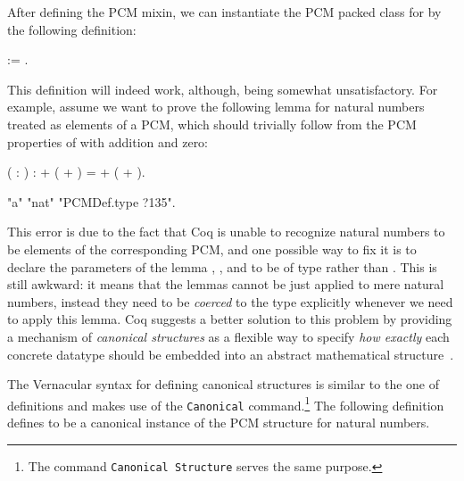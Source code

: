After defining the PCM mixin, we can instantiate the PCM packed class
for  by the following definition:


\begin{coqdoccode}
\coqdocemptyline
\coqdocnoindent
{}  :=   .\coqdoceol
\coqdocemptyline
\end{coqdoccode}


This definition will indeed work, although, being somewhat
unsatisfactory. For example, assume we want to prove the following
lemma for natural numbers treated as elements of a PCM, which should
trivially follow from the PCM properties of  with addition and
zero:


\coqdoceol
\coqdocemptyline
\coqdocnoindent
{}  (   : ) :  + ( + ) =  + ( + ).

\coqdocemptyline


\coqdoceol
\coqdocemptyline
\coqdocnoindent
{}  "a"   "nat"        "PCMDef.type ?135".

\coqdocemptyline


This error is due to the fact that Coq is unable to recognize natural
numbers to be elements of the corresponding PCM, and one possible way
to fix it is to declare the parameters of the lemma , ,
 and  to be of type  rather than . This is still
awkward: it means that the lemmas cannot be just applied to mere
natural numbers, instead they need to be \textit{coerced} to the 
type explicitly whenever we need to apply this lemma. Coq suggests a
better solution to this problem by providing a mechanism of \textit{canonical
structures} as a flexible way to specify \textit{how exactly} each concrete
datatype should be embedded into an abstract mathematical
structure~\cite{Saibi:PhD}.




The Vernacular syntax for defining canonical structures is similar to
the one of definitions and makes use of the \texttt{Canonical}
command.\footnote{The command \texttt{Canonical Structure}
 serves the same purpose.}
The following definition defines  to be a canonical instance
of the PCM structure for natural numbers.


